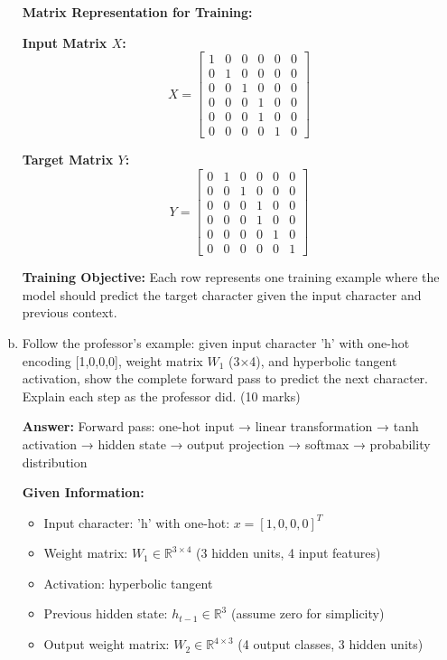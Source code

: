 \documentclass[12pt]{article}
\newcommand{\answer}[1]{{\color{answercolor}\textbf{Answer:} #1}}
\newcommand{\explanation}[1]{{\color{explanationcolor}#1}}
\begin{document}
\begin{enumerate}[(a)]
{    \textbf{Matrix Representation for Training:}
    
    \textbf{Input Matrix $X$:}
    $$X = \begin{bmatrix}
    1 & 0 & 0 & 0 & 0 & 0 \\
    0 & 1 & 0 & 0 & 0 & 0 \\
    0 & 0 & 1 & 0 & 0 & 0 \\
    0 & 0 & 0 & 1 & 0 & 0 \\
    0 & 0 & 0 & 1 & 0 & 0 \\
    0 & 0 & 0 & 0 & 1 & 0
    \end{bmatrix}$$
    
    \textbf{Target Matrix $Y$:}
    $$Y = \begin{bmatrix}
    0 & 1 & 0 & 0 & 0 & 0 \\
    0 & 0 & 1 & 0 & 0 & 0 \\
    0 & 0 & 0 & 1 & 0 & 0 \\
    0 & 0 & 0 & 1 & 0 & 0 \\
    0 & 0 & 0 & 0 & 1 & 0 \\
    0 & 0 & 0 & 0 & 0 & 1
    \end{bmatrix}$$
    
    \textbf{Training Objective:}
    Each row represents one training example where the model should predict the target character given the input character and previous context.
    }
    
    \item Follow the professor's example: given input character 'h' with one-hot encoding [1,0,0,0], weight matrix $W_1$ (3×4), and hyperbolic tangent activation, show the complete forward pass to predict the next character. Explain each step as the professor did. \hfill (10 marks)
    
    \answer{Forward pass: one-hot input → linear transformation → tanh activation → hidden state → output projection → softmax → probability distribution}
    
    \explanation{
    \textbf{Given Information:}
    \begin{itemize}
        \item Input character: 'h' with one-hot: $x = [1, 0, 0, 0]^T$
        \item Weight matrix: $W_1 \in \mathbb{R}^{3 \times 4}$ (3 hidden units, 4 input features)
        \item Activation: hyperbolic tangent
        \item Previous hidden state: $h_{t-1} \in \mathbb{R}^3$ (assume zero for simplicity)
        \item Output weight matrix: $W_2 \in \mathbb{R}^{4 \times 3}$ (4 output classes, 3 hidden units)
    \end{itemize}
    
}
\end{enumerate}
\end{document}
